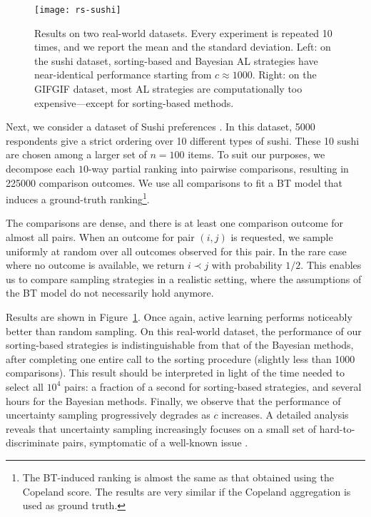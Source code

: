 \begin{figure}[t]
\centering
\texttt{[image: rs-sushi]}
\caption{
Results on two real-world datasets.
Every experiment is repeated \num{10} times, and we report the mean and the standard deviation.
Left: on the sushi dataset, sorting-based and Bayesian AL strategies have near-identical performance starting from $c \approx \num{1000}$.
Right: on the GIFGIF dataset, most AL strategies are computationally too expensive---except for sorting-based methods.
}
\label{rs:fig:sushi}
\end{figure}

Next, we consider a dataset of Sushi preferences \citep{kamishima2009efficient}.
In this dataset, \num{5000} respondents give a strict ordering over \num{10} different types of sushi.
These \num{10} sushi are chosen among a larger set of $n = \num{100}$ items.
To suit our purposes, we decompose each $10$-way partial ranking into pairwise comparisons, resulting in \num{225000} comparison outcomes.
We use all comparisons to fit a BT model that induces a ground-truth ranking\footnote{
The BT-induced ranking is almost the same as that obtained using the Copeland score.
The results are very similar if the Copeland aggregation is used as ground truth.}.

The comparisons are dense, and there is at least one comparison outcome for almost all pairs.
When an outcome for pair $(i,j)$ is requested, we sample uniformly at random over all outcomes observed for this pair.
In the rare case where no outcome is available, we return $i \prec j$ with probability $1/2$.
This enables us to compare sampling strategies in a realistic setting, where the assumptions of the BT model do not necessarily hold anymore.

Results are shown in Figure~\ref{rs:fig:sushi}.
Once again, active learning performs noticeably better than random sampling.
On this real-world dataset, the performance of our sorting-based strategies is indistinguishable from that of the Bayesian methods, after completing one entire call to the sorting procedure (slightly less than \num{1000} comparisons).
This result should be interpreted in light of the time needed to select all $10^4$ pairs: a fraction of a second for sorting-based strategies, and several hours for the Bayesian methods.
Finally, we observe that the performance of uncertainty sampling progressively degrades as $c$ increases.
A detailed analysis reveals that uncertainty sampling increasingly focuses on a small set of hard-to-discriminate pairs, symptomatic of a well-known issue \citep{settles2012active}.


